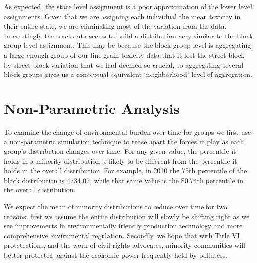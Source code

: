 \documentclass[12pt,twoside]{dukestatscithesis}
\theoremstyle{definition}
\theoremstyle{definition}
\theoremstyle{definition}
\theoremstyle{remark}
\begin{document}
As expected, the state level assignment is a poor approximation of the
lower level assignments. Given that we are assigning each individual the
mean toxicity in their entire state, we are eliminating most of the
variation from the data. Interestingly the tract data seems to build a
distribution very similar to the block group level assignment. This may
be because the block group level is aggregating a large enough group of
our fine grain toxicity data that it lost the street block by street
block variation that we had deemed so crucial, so aggregating several
block groups gives us a conceptual equivalent `neighborhood' level of
aggregation.

\section{Non-Parametric Analysis}\label{non-parametric-analysis}

To examine the change of environmental burden over time for groups we
first use a non-parametric simulation technique to tease apart the
forces in play as each group's distribution changes over time. For any
given value, the percentile it holds in a minority distribution is
likely to be different from the percentile it holds in the overall
distribution. For example, in 2010 the 75th percentile of the black
distribution is 4734.07, while that same value is the 80.74th percentile
in the overall distribution.

We expect the mean of minority distributions to reduce over time for two
reasons: first we assume the entire distribution will slowly be shifting
right as we see improvements in environmentally friendly production
technology and more comprehensive envirnmental regulation. Secondly, we
hope that with Title VI protetections, and the work of civil rights
advocates, minority communities will better protected against the
economic power frequently held by polluters.
\end{document}
